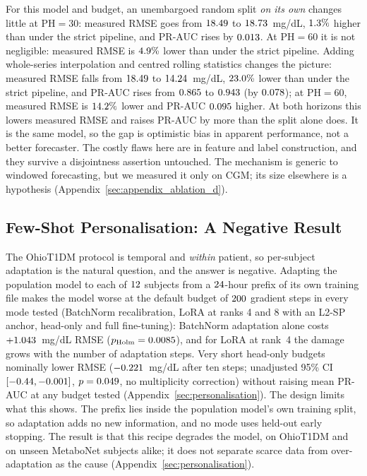 \documentclass[pmlr,twocolumn,10pt]{jmlr}
\newcommand{\PH}{\mathrm{PH}}
\begin{document}
For this model and budget, an unembargoed random split \emph{on its own}
changes little at $\PH = 30$: measured RMSE goes from $18.49$
to $18.73$~mg/dL, $1.3\%$ higher
than under the strict pipeline, and PR-AUC rises by $0.013$.
At $\PH = 60$ it is not negligible: measured RMSE is
$4.9\%$ lower than under the strict pipeline.
Adding whole-series interpolation and centred rolling statistics changes the
picture: measured RMSE falls from $18.49$ to
$14.24$~mg/dL, $23.0\%$ lower than
under the strict pipeline, and PR-AUC rises from $0.865$ to
$0.943$ (by $0.078$); at $\PH = 60$,
measured RMSE is $14.2\%$ lower and PR-AUC
$0.095$ higher. At both horizons this lowers measured
RMSE and raises PR-AUC by more than the split alone does. It is the same model,
so the gap is optimistic bias in apparent performance, not a better forecaster. The costly flaws here are in feature and label construction, and they
survive a disjointness assertion untouched. The mechanism is generic to windowed
forecasting, but we measured it only on CGM; its size elsewhere is a hypothesis
(Appendix~\ref{sec:appendix_ablation_d}).

\subsection{Few-Shot Personalisation: A Negative Result}

The OhioT1DM protocol is temporal and \emph{within} patient, so per-subject
adaptation is the natural question, and the answer is negative. Adapting the
population model to each of $12$ subjects from a
$24$-hour prefix of its own training file makes the model worse
at the default budget of $200$ gradient steps in every mode tested (BatchNorm
recalibration, LoRA at ranks 4 and 8 with an
L2-SP anchor, head-only and full fine-tuning): BatchNorm adaptation alone costs
$+1.043$~mg/dL RMSE ($p_{\text{Holm}} = 0.0085$),
and for LoRA at rank~4 the damage grows with the number of adaptation steps. Very
short head-only budgets nominally lower RMSE
($-0.221$~mg/dL after ten steps; unadjusted 95\% CI
$[-0.44, -0.001]$, $p = 0.049$,
no multiplicity correction) without raising mean PR-AUC at any budget tested
(Appendix~\ref{sec:personalisation}). The design limits
what this shows. The prefix lies inside the population model's own training
split, so adaptation adds no new information, and no mode uses held-out early
stopping. The result is that this recipe degrades the model, on OhioT1DM and on
unseen MetaboNet subjects alike; it does not separate scarce data from
over-adaptation as the cause (Appendix~\ref{sec:personalisation}).
\end{document}
